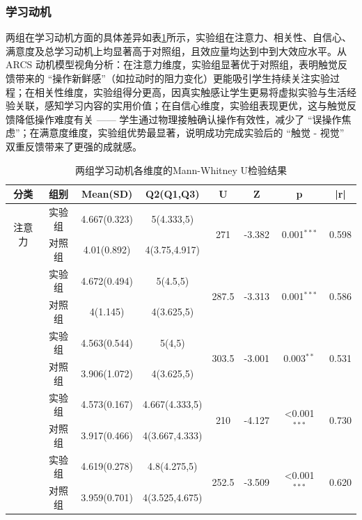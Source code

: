 \documentclass[runningheads]{llncs}
\begin{document}
\subsubsection{学习动机}
两组在学习动机方面的具体差异如表\ref{tab:learning-motivation}所示，实验组在注意力、相关性、自信心、满意度及总学习动机上均显著高于对照组，且效应量均达到中到大效应水平。从 ARCS 动机模型视角分析：在注意力维度，实验组显著优于对照组，表明触觉反馈带来的 “操作新鲜感”（如拉动时的阻力变化）更能吸引学生持续关注实验过程；在相关性维度，实验组得分更高，因真实触感让学生更易将虚拟实验与生活经验关联，感知学习内容的实用价值；在自信心维度，实验组表现更优，这与触觉反馈降低操作难度有关 —— 学生通过物理接触确认操作有效性，减少了 “误操作焦虑”；在满意度维度，实验组优势最显著，说明成功完成实验后的 “触觉 - 视觉” 双重反馈带来了更强的成就感。

\begin{table}[t]
\centering
\setlength{\tabcolsep}{3pt} %
\caption{两组学习动机各维度的Mann-Whitney U检验结果}
\label{tab:learning-motivation}
\begin{tabular}{cccccccc}
\toprule
\textbf{分类} & \textbf{组别} & \textbf{Mean(SD)} & \textbf{Q2(Q1,Q3)} & \textbf{U} & \textbf{Z} & \textbf{p} & \textbf{|r|} \\
\midrule
\multirow{2}{*}{注意力} 
& 实验组 & 4.667(0.323) & 5(4.333,5) & \multirow{2}{*}{271} & \multirow{2}{*}{-3.382} & \multirow{2}{*}{0.001\(^{***}\)} & \multirow{2}{*}{0.598} \\
& 对照组 & 4.01(0.892) & 4(3.75,4.917) \\
\addlinespace
\multirow{2}{*}{相关性} 
& 实验组 & 4.672(0.494) & 5(4.5,5) & \multirow{2}{*}{287.5} & \multirow{2}{*}{-3.313} & \multirow{2}{*}{0.001\(^{***}\)} & \multirow{2}{*}{0.586} \\
& 对照组 & 4(1.145) & 4(3.625,5) \\
\addlinespace
\multirow{2}{*}{自信心} 
& 实验组 & 4.563(0.544) & 5(4,5) & \multirow{2}{*}{303.5} & \multirow{2}{*}{-3.001} & \multirow{2}{*}{0.003\(^{**}\)} & \multirow{2}{*}{0.531} \\
& 对照组 & 3.906(1.072) & 4(3.625,5) \\
\addlinespace
\multirow{2}{*}{满意度} 
& 实验组 & 4.573(0.167) & 4.667(4.333,5) & \multirow{2}{*}{210} & \multirow{2}{*}{-4.127} & \multirow{2}{*}{<0.001\(^{***}\)} & \multirow{2}{*}{0.730} \\
& 对照组 & 3.917(0.466) & 4(3.667,4.333) \\
\addlinespace
\multirow{2}{*}{学习动机} 
& 实验组 & 4.619(0.278) & 4.8(4.275,5) & \multirow{2}{*}{252.5} & \multirow{2}{*}{-3.509} & \multirow{2}{*}{<0.001\(^{***}\)} & \multirow{2}{*}{0.620} \\
& 对照组 & 3.959(0.701) & 4(3.525,4.675) \\
\bottomrule
\end{tabular}
\end{table}
\end{document}

